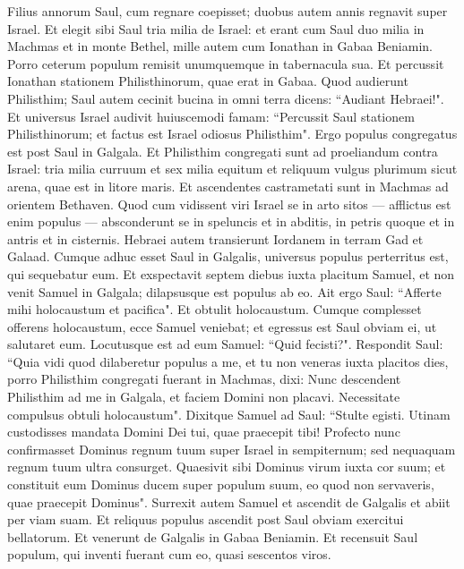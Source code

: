 \begin{biblechapter}  
\verse Filius annorum Saul, cum regnare coepisset; duobus autem annis regnavit super Israel. 
\verse Et elegit sibi Saul tria milia de Israel: et erant cum Saul duo milia in Machmas et in monte Bethel, mille autem cum Ionathan in Gabaa Beniamin. Porro ceterum populum remisit unumquemque in tabernacula sua. 
\verse Et percussit Ionathan stationem Philisthinorum, quae erat in Gabaa. Quod audierunt Philisthim; Saul autem cecinit bucina in omni terra dicens: “Audiant Hebraei!". 
\verse Et universus Israel audivit huiuscemodi famam: “Percussit Saul stationem Philisthinorum; et factus est Israel odiosus Philisthim". Ergo populus congregatus est post Saul in Galgala. 
\verse Et Philisthim congregati sunt ad proeliandum contra Israel: tria milia curruum et sex milia equitum et reliquum vulgus plurimum sicut arena, quae est in litore maris. Et ascendentes castrametati sunt in Machmas ad orientem Bethaven. 
\verse Quod cum vidissent viri Israel se in arto sitos — afflictus est enim populus — absconderunt se in speluncis et in abditis, in petris quoque et in antris et in cisternis. 
\verse Hebraei autem transierunt Iordanem in terram Gad et Galaad. Cumque adhuc esset Saul in Galgalis, universus populus perterritus est, qui sequebatur eum. 
\verse Et exspectavit septem diebus iuxta placitum Samuel, et non venit Samuel in Galgala; dilapsusque est populus ab eo. 
\verse Ait ergo Saul: “Afferte mihi holocaustum et pacifica". Et obtulit holocaustum. 
\verse Cumque complesset offerens holocaustum, ecce Samuel veniebat; et egressus est Saul obviam ei, ut salutaret eum. 
\verse Locutusque est ad eum Samuel: “Quid fecisti?". Respondit Saul: “Quia vidi quod dilaberetur populus a me, et tu non veneras iuxta placitos dies, porro Philisthim congregati fuerant in Machmas, 
\verse dixi: Nunc descendent Philisthim ad me in Galgala, et faciem Domini non placavi. Necessitate compulsus obtuli holocaustum". 
\verse Dixitque Samuel ad Saul: “Stulte egisti. Utinam custodisses mandata Domini Dei tui, quae praecepit tibi! Profecto nunc confirmasset Dominus regnum tuum super Israel in sempiternum; 
\verse sed nequaquam regnum tuum ultra consurget. Quaesivit sibi Dominus virum iuxta cor suum; et constituit eum Dominus ducem super populum suum, eo quod non servaveris, quae praecepit Dominus". 
\verse Surrexit autem Samuel et ascendit de Galgalis et abiit per viam suam. Et reliquus populus ascendit post Saul obviam exercitui bellatorum. Et venerunt de Galgalis in Gabaa Beniamin. Et recensuit Saul populum, qui inventi fuerant cum eo, quasi sescentos viros. 

\end{biblechapter}

